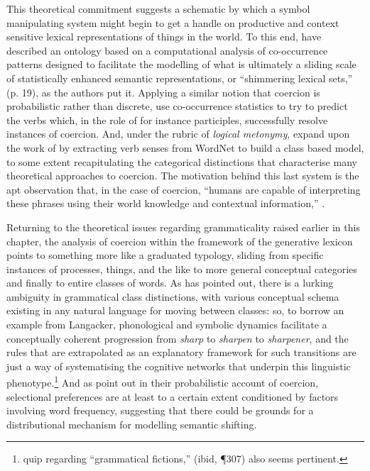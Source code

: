 This theoretical commitment suggests a schematic by which a symbol manipulating system might begin to get a handle on productive and context sensitive lexical representations of things in the world.  To this end, \cite{JezekEA2010} have described an ontology based on a computational analysis of co-occurrence patterns designed to facilitate the modelling of what is ultimately a sliding scale of statistically enhanced semantic representations, or ``shimmering lexical sets,'' (p. 19), as the authors put it.  Applying a similar notion that coercion is probabilistic rather than discrete, \cite{LapataEA2003} use co-occurrence statistics to try to predict the verbs which, in the role of for instance participles, successfully resolve instances of coercion.  And, under the rubric of \emph{logical metonymy}, \cite{ShutovaEA2013b} expand upon the work of \citeauthor{LapataEA2003} by extracting verb senses from WordNet to build a class based model, to some extent recapitulating the categorical distinctions that characterise many theoretical approaches to coercion.  The motivation behind this last system is the apt observation that, in the case of coercion, ``humans are capable of interpreting these phrases using their world knowledge and contextual information,'' \citep[][11:2]{ShutovaEA2013b}.

Returning to the theoretical issues regarding grammaticality raised earlier in this chapter, the analysis of coercion within the framework of the generative lexicon points to something more like a graduated typology, sliding from specific instances of processes, things, and the like to more general conceptual categories and finally to entire classes of words.  As \cite{Langacker1991} has pointed out, there is a lurking ambiguity in grammatical class distinctions, with various conceptual schema existing in any natural language for moving between classes: so, to borrow an example from Langacker, phonological and symbolic dynamics facilitate a conceptually coherent progression from \emph{sharp} to \emph{sharpen} to \emph{sharpener}, and the rules that are extrapolated as an explanatory framework for such transitions are just a way of systematising the cognitive networks that underpin this linguistic phenotype.\footnote{ quip regarding ``grammatical fictions,'' (ibid, \P 307) also seems pertinent.}  And as \cite{CopestakeEA1995} point out in their probabilistic account of coercion, selectional preferences are at least to a certain extent conditioned by factors involving word frequency, suggesting that there could be grounds for a distributional mechanism for modelling semantic shifting.

